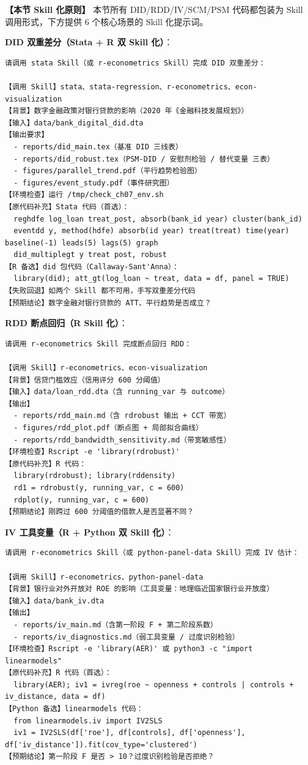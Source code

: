 \textbf{【本节 Skill 化原则】} 本节所有 DID/RDD/IV/SCM/PSM 代码都包装为 Skill 调用形式，下方提供 6 个核心场景的 Skill 化提示词。

\textbf{DID 双重差分（Stata + R 双 Skill 化）}：
\begin{lstlisting}
请调用 stata Skill（或 r-econometrics Skill）完成 DID 双重差分：

【调用 Skill】stata、stata-regression、r-econometrics、econ-visualization
【背景】数字金融政策对银行贷款的影响（2020 年《金融科技发展规划》）
【输入】data/bank_digital_did.dta
【输出要求】
  - reports/did_main.tex（基准 DID 三线表）
  - reports/did_robust.tex（PSM-DID / 安慰剂检验 / 替代变量 三表）
  - figures/parallel_trend.pdf（平行趋势检验图）
  - figures/event_study.pdf（事件研究图）
【环境检查】运行 /tmp/check_ch07_env.sh
【原代码补充】Stata 代码（首选）：
  reghdfe log_loan treat_post, absorb(bank_id year) cluster(bank_id)
  eventdd y, method(hdfe) absorb(id year) treat(treat) time(year) baseline(-1) leads(5) lags(5) graph
  did_multiplegt y treat post, robust
【R 备选】did 包代码（Callaway-Sant'Anna）：
  library(did); att_gt(log_loan ~ treat, data = df, panel = TRUE)
【失败回退】如两个 Skill 都不可用，手写双重差分代码
【预期结论】数字金融对银行贷款的 ATT、平行趋势是否成立？
\end{lstlisting}

\textbf{RDD 断点回归（R Skill 化）}：
\begin{lstlisting}
请调用 r-econometrics Skill 完成断点回归 RDD：

【调用 Skill】r-econometrics、econ-visualization
【背景】信贷门槛效应（信用评分 600 分阈值）
【输入】data/loan_rdd.dta（含 running_var 与 outcome）
【输出】
  - reports/rdd_main.md（含 rdrobust 输出 + CCT 带宽）
  - figures/rdd_plot.pdf（断点图 + 局部拟合曲线）
  - reports/rdd_bandwidth_sensitivity.md（带宽敏感性）
【环境检查】Rscript -e 'library(rdrobust)'
【原代码补充】R 代码：
  library(rdrobust); library(rddensity)
  rd1 = rdrobust(y, running_var, c = 600)
  rdplot(y, running_var, c = 600)
【预期结论】刚跨过 600 分阈值的借款人是否显著不同？
\end{lstlisting}

\textbf{IV 工具变量（R + Python 双 Skill 化）}：
\begin{lstlisting}
请调用 r-econometrics Skill（或 python-panel-data Skill）完成 IV 估计：

【调用 Skill】r-econometrics、python-panel-data
【背景】银行业对外开放对 ROE 的影响（工具变量：地理临近国家银行业开放度）
【输入】data/bank_iv.dta
【输出】
  - reports/iv_main.md（含第一阶段 F + 第二阶段系数）
  - reports/iv_diagnostics.md（弱工具变量 / 过度识别检验）
【环境检查】Rscript -e 'library(AER)' 或 python3 -c "import linearmodels"
【原代码补充】R 代码（首选）：
  library(AER); iv1 = ivreg(roe ~ openness + controls | controls + iv_distance, data = df)
【Python 备选】linearmodels 代码：
  from linearmodels.iv import IV2SLS
  iv1 = IV2SLS(df['roe'], df[controls], df['openness'], df['iv_distance']).fit(cov_type='clustered')
【预期结论】第一阶段 F 是否 > 10？过度识别检验是否拒绝？
\end{lstlisting}

